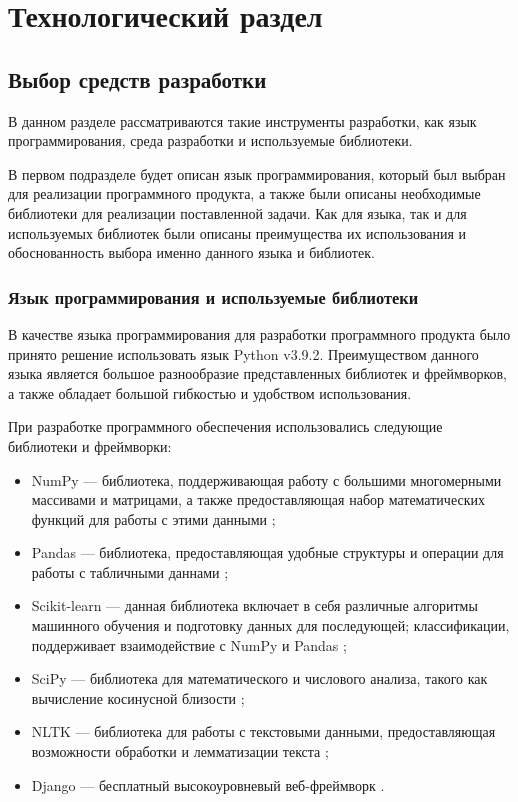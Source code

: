 \section{Технологический раздел}

\subsection{Выбор средств разработки}

В данном разделе рассматриваются такие инструменты разработки, как язык программирования, среда разработки и используемые библиотеки.

В первом подразделе будет описан язык программирования, который был выбран для реализации программного продукта, а также были описаны необходимые библиотеки для реализации поставленной задачи. Как для языка, так и для используемых библиотек были описаны преимущества их использования и обоснованность выбора именно данного языка и библиотек.

\subsubsection{Язык программирования и используемые библиотеки}

В качестве языка программирования для разработки программного продукта было принято решение использовать язык Python v3.9.2. Преимуществом данного языка является большое разнообразие представленных библиотек и фреймворков, а также обладает большой гибкостью и удобством использования.

При разработке программного обеспечения использовались следующие библиотеки и фреймворки:

\begin{itemize}
	\item NumPy --- библиотека, поддерживающая работу с большими
	многомерными массивами и матрицами, а также предоставляющая
	набор математических функций для работы с этими данными \cite{NumPy};
	\item Pandas --- библиотека, предоставляющая удобные структуры и операции для работы с табличными даннами \cite{Pandas};
	\item Scikit-learn --- данная библиотека включает в себя различные алгоритмы машинного обучения и подготовку данных для последующей;
	классификации, поддерживает взаимодействие с NumPy и Pandas \cite{Scikit-learn};
	\item SciPy --- библиотека для математического и числового анализа, такого как вычисление косинусной близости \cite{SciPy};
	\item NLTK --- библиотека для работы с текстовыми данными, предоставляющая возможности обработки и лемматизации текста \cite{NLTK}; 
	\item Django --- бесплатный высокоуровневый веб-фреймворк \cite{Django}.
\end{itemize}

